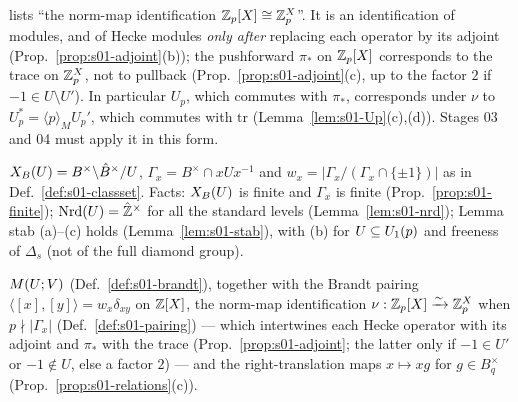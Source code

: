 \begin{remark}\label{rem:s01-nu-hecke}
 lists ``the norm-map identification $\mathbb{Z}_p[X]\cong\mathbb{Z}_p^X$''.
It is an identification of modules, and of Hecke modules \emph{only after} replacing each operator by its adjoint (Prop.~\ref{prop:s01-adjoint}(b)); the
pushforward $\pi_*$ on $\mathbb{Z}_p[X]$ corresponds to the trace on $\mathbb{Z}_p^X$, not to pullback (Prop.~\ref{prop:s01-adjoint}(c), up to the factor $2$ if $-1\in U\setminus U'$). In particular
$U_p$, which commutes with $\pi_*$, corresponds under $\nu$ to $U_p^*=\langle p\rangle_MU_p'$, which commutes with $\mathrm{tr}$ (Lemma~\ref{lem:s01-Up}(c),(d)). Stages 03 and 04 must apply it in this form.
\end{remark}

\begin{interface}\label{if:s01-classset}
$X_B(U)=B^\times\backslash\hat{B}^\times/U$, $\Gamma_x=B^\times\cap xUx^{-1}$ and $w_x=|\Gamma_x/(\Gamma_x\cap\{\pm1\})|$ as in
Def.~\ref{def:s01-classset}. Facts: $X_B(U)$ is finite and $\Gamma_x$ is finite (Prop.~\ref{prop:s01-finite});
$\mathrm{Nrd}(U)=\hat{\mathbb{Z}}^\times$ for all the standard levels (Lemma~\ref{lem:s01-nrd}); Lemma stab (a)--(c) holds (Lemma~\ref{lem:s01-stab}),
with (b) for $U\subseteq U_1(p)$ and freeness of $\Delta_s$ (not of the full diamond group).
\end{interface}

\begin{interface}\label{if:s01-brandt}
$M(U;V)$ (Def.~\ref{def:s01-brandt}), together with the Brandt pairing $\langle[x],[y]\rangle=w_x\delta_{xy}$ on $\mathbb{Z}[X]$,
the norm-map identification $\nu:\mathbb{Z}_p[X]\xrightarrow{\sim}\mathbb{Z}_p^X$ when $p\nmid|\Gamma_x|$ (Def.~\ref{def:s01-pairing}) --- which
intertwines each Hecke operator with its adjoint and $\pi_*$ with the trace (Prop.~\ref{prop:s01-adjoint}; the latter only if
$-1\in U'$ or $-1\notin U$, else a factor $2$) --- and the
right-translation maps $x\mapsto xg$ for $g\in B_q^\times$ (Prop.~\ref{prop:s01-relations}(c)).
\end{interface}
